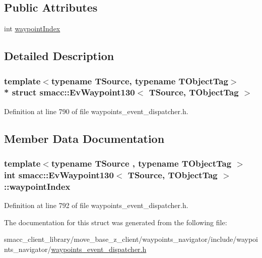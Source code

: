 \subsection*{Public Attributes}
\begin{DoxyCompactItemize}
\item 
int \hyperlink{structsmacc_1_1EvWaypoint130_a6b54ba6b90697fee0d00e355ceb5fa3c}{waypoint\+Index}
\end{DoxyCompactItemize}


\subsection{Detailed Description}
\subsubsection*{template$<$typename T\+Source, typename T\+Object\+Tag$>$\\*
struct smacc\+::\+Ev\+Waypoint130$<$ T\+Source, T\+Object\+Tag $>$}



Definition at line 790 of file waypoints\+\_\+event\+\_\+dispatcher.\+h.



\subsection{Member Data Documentation}
\subsubsection[{\texorpdfstring{waypoint\+Index}{waypointIndex}}]{\setlength{\rightskip}{0pt plus 5cm}template$<$typename T\+Source , typename T\+Object\+Tag $>$ int {\bf smacc\+::\+Ev\+Waypoint130}$<$ T\+Source, T\+Object\+Tag $>$\+::waypoint\+Index}\hypertarget{structsmacc_1_1EvWaypoint130_a6b54ba6b90697fee0d00e355ceb5fa3c}{}\label{structsmacc_1_1EvWaypoint130_a6b54ba6b90697fee0d00e355ceb5fa3c}


Definition at line 792 of file waypoints\+\_\+event\+\_\+dispatcher.\+h.



The documentation for this struct was generated from the following file\+:\begin{DoxyCompactItemize}
\item 
smacc\+\_\+client\+\_\+library/move\+\_\+base\+\_\+z\+\_\+client/waypoints\+\_\+navigator/include/waypoints\+\_\+navigator/\hyperlink{waypoints__event__dispatcher_8h}{waypoints\+\_\+event\+\_\+dispatcher.\+h}\end{DoxyCompactItemize}
